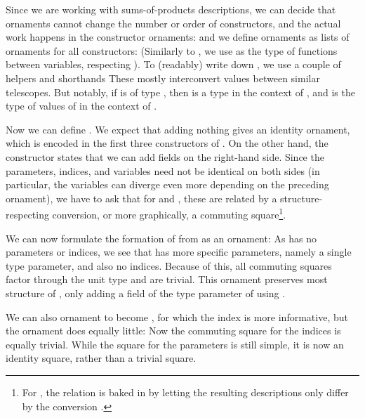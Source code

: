 Since we are working with sums-of-products descriptions, we can decide that ornaments cannot change the number or order of constructors, and the actual work happens in the constructor ornaments:
and we define ornaments as lists of ornaments for all constructors:
(Similarly to , we use  as the type of functions between variables, respecting ). To (readably) write down , we use a couple of helpers and shorthands
These mostly interconvert values between similar telescopes. But notably, if  is of type , then  is a type in the context of , and  is the type of values of  in the context of .

Now we can define . We expect that adding nothing gives an identity ornament, which is encoded in the first three constructors of .
On the other hand, the  constructor states that we can add fields on the right-hand side. Since the parameters, indices, and variables need not be identical on both sides (in particular, the variables can diverge even more depending on the preceding ornament), we have to ask that for  and , these are related by a structure-respecting conversion, or more graphically, a commuting square\footnote{For , the relation is baked in by letting the resulting descriptions only differ by the conversion .}. %

We can now formulate the formation of  from \bN{} as an ornament:
As \bN{} has no parameters or indices, we see that  has more specific parameters, namely a single type parameter, and also no indices. Because of this, all commuting squares factor through the unit type and are trivial. This ornament preserves most structure of \bN{}, only adding a field of the type parameter of  using .

We can also ornament  to become , for which the index is more informative, but the ornament does equally little:
Now the commuting square for the indices is equally trivial. While the square for the parameters is still simple, it is now an identity square, rather than a trivial square.

